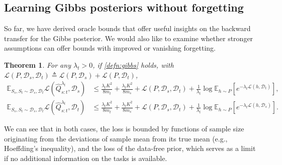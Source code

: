 \documentclass{article}
\theoremstyle{plain}
\newtheorem{theorem}{Theorem}[section]
\theoremstyle{definition}
\theoremstyle{remark}
\newcommand{\LF}[1]{{\textcolor{blue}{#1}}}
\begin{document}
\subsection{Learning Gibbs posteriors without forgetting}

So far, we have derived oracle bounds that offer useful insights on the backward transfer for the Gibbs posterior. We would also like to examine whether stronger assumptions can offer bounds with improved or vanishing forgetting.
%
\begin{theorem}
For any $\lambda_t>0$, if \eqref{defn:gibbs} holds, with $\mathcal{L}(P,\mathcal{D}_s,\mathcal{D}_t)\triangleq \mathcal{L}(P,\mathcal{D}_s)+\mathcal{L}(P,\mathcal{D}_t)$, 
%
\begin{align} \label{eq:thm-start-of-no-forget}
\mathbb{E}_{S_s,S_t\sim \mathcal{D}_s,\mathcal{D}_t}\mathcal{L}( \hat{Q}^{\lambda_t}_{s:t},\mathcal{D}_s)&\leq \frac{\lambda_t K^2}{8m_t}+\frac{\lambda_t K^2}{8m_s}+\mathcal{L}(P,\mathcal{D}_s,\mathcal{D}_t) +\frac{1}{\lambda_t}\log\mathbb{E}_{h\sim P}\left [e^{-\lambda_t\mathcal{L}(h,\mathcal{D}_t)} \right ], \\
\mathbb{E}_{S_s,S_t\sim \mathcal{D}_s,\mathcal{D}_t}\mathcal{L}( \hat{Q}^{\lambda_t}_{s:t},\mathcal{D}_t)&\leq \frac{\lambda_t K^2}{8m_t}+\frac{\lambda_t K^2}{8m_s}+\mathcal{L}(P,\mathcal{D}_s,\mathcal{D}_t) +\frac{1}{\lambda_t}\log\mathbb{E}_{h\sim P}\left [e^{-\lambda_t\mathcal{L}(h,\mathcal{D}_s)} \right ].\nonumber
\end{align}
\end{theorem}
%
We can see that in both cases, the loss is bounded by functions of sample size originating from the deviations of sample mean from its true mean (e.g., Hoeffding's inequality), and the loss of the data-free prior, which serves as a limit if no additional information on the tasks is available.
\end{document}

